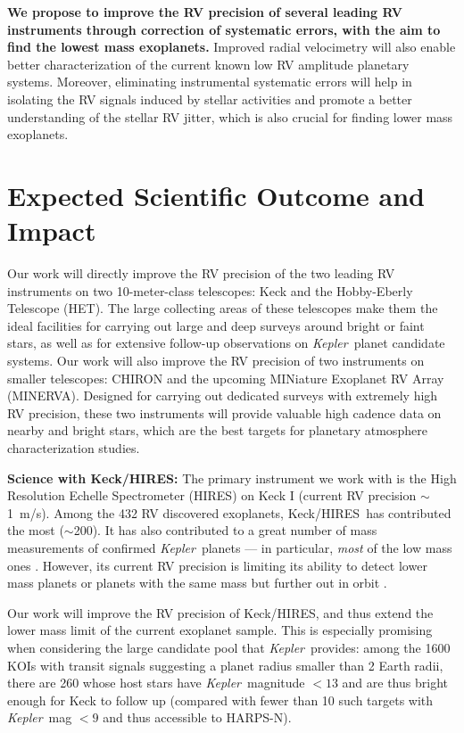 \documentclass[12pt]{article}
\def\mps{m/s}
\def\kepler{{\it Kepler}}
\def\minerva{MINERVA}
\def\keck{Keck/HIRES}
\begin{document}
\textbf{We propose to improve the RV precision of several leading RV
  instruments through correction of systematic errors, with the aim to
  find the lowest mass exoplanets.} Improved radial velocimetry will
also enable better characterization of the current known low RV
amplitude planetary systems. Moreover, eliminating instrumental
systematic errors will help in isolating the RV signals induced by
stellar activities and promote a better understanding of the stellar
RV jitter, which is also crucial for finding lower mass exoplanets.


\vspace{-3pt}
\section{Expected Scientific Outcome and Impact}

Our work will directly improve the RV precision of the two leading RV
instruments on two 10-meter-class telescopes: Keck and the
Hobby-Eberly Telescope (HET). The large collecting areas of these
telescopes make them the ideal facilities for carrying out large and
deep surveys around bright or faint stars, as well as for extensive
follow-up observations on \kepler\ planet candidate systems. Our work
will also improve the RV precision of two instruments on
smaller telescopes: CHIRON and the upcoming MINiature Exoplanet RV
Array (\minerva). Designed for carrying out dedicated surveys with
extremely high RV precision, these two instruments will provide
valuable high cadence data on nearby and bright stars, which are the
best targets for planetary atmosphere characterization studies.

\textbf{Science with \keck: } The primary instrument we work with is
the High Resolution Echelle Spectrometer (HIRES) on Keck I (current RV
precision $\sim$1~\mps). Among the 432 RV discovered exoplanets,
\keck\ has contributed the most ($\sim$200). It has also contributed
to a great number of mass measurements of confirmed \kepler\ planets
--- in particular, \textit{most} of the low mass ones
\citep[e.g.,][]{gautier2012,gilliland2013,howard2013,marcy2014}. However,
its current RV precision is limiting its ability to detect lower mass
planets or planets with the same mass but further out in orbit
\citep[e.g.,][]{marcy2014}.

Our work will improve the RV precision of \keck, and thus extend the
lower mass limit of the current exoplanet sample. This is especially
promising when considering the large candidate pool that
\kepler\ provides: among the 1600 KOIs with transit signals suggesting
a planet radius smaller than 2 Earth radii, there are 260 whose host
stars have \kepler\ magnitude $< 13$ and are thus bright enough for
Keck to follow up (compared with fewer than 10 such targets with
\kepler\ mag $< 9$ and thus accessible to HARPS-N).
\end{document}
